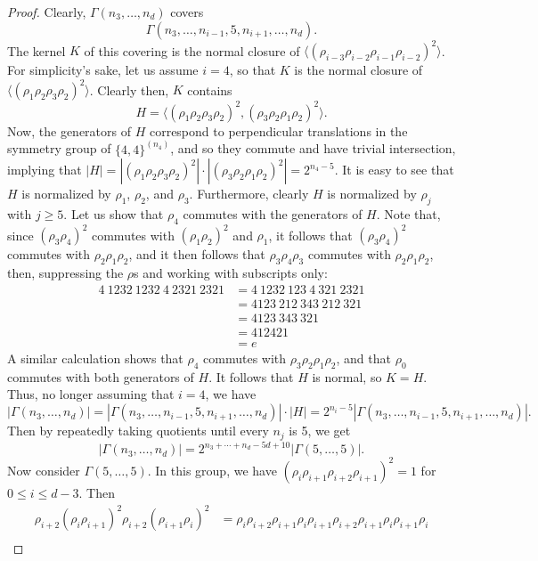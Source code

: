 \documentclass[12pt]{amsart}
\newcommand{\G}{\Gamma}
\theoremstyle{definition}
\begin{document}
\begin{proof}
Clearly, $\G(n_3, \ldots, n_d)$ covers 
	\[ \G(n_3, \ldots, n_{i-1}, 5, n_{i+1}, \ldots, n_d). \]
	The kernel $K$ of this covering is the normal closure of $\langle (\rho_{i-3} \rho_{i-2} \rho_{i-1} \rho_{i-2})^2 \rangle$. For simplicity's sake, let us assume $i = 4$, so that $K$ is the normal closure of $\langle (\rho_1 \rho_2 \rho_3 \rho_2)^2 \rangle$. Clearly then, $K$ contains
	\[ H = \langle (\rho_1 \rho_2 \rho_3 \rho_2)^2, (\rho_3 \rho_2 \rho_1 \rho_2)^2 \rangle. \]
	Now, the generators of $H$ correspond to perpendicular translations in the symmetry group of $\{4,4\}^{(n_4)}$, and so they commute and have trivial intersection, implying that $|H| = |(\rho_1 \rho_2 \rho_3 \rho_2)^2| \cdot |(\rho_3 \rho_2 \rho_1 \rho_2)^2| = 2^{n_4-5}$. It is easy to see that $H$ is normalized by $\rho_1$, $\rho_2$, and $\rho_3$. Furthermore, clearly $H$ is normalized by $\rho_j$ with $j \geq 5$. Let us show that $\rho_4$ commutes with the generators of $H$. Note that, since $(\rho_3 \rho_4)^2$ commutes with $(\rho_1 \rho_2)^2$ and $\rho_1$, it follows that $(\rho_3 \rho_4)^2$ commutes with $\rho_2 \rho_1 \rho_2$, and it then follows that $\rho_3 \rho_4 \rho_3$ commutes with $\rho_2 \rho_1 \rho_2$, then, suppressing the $\rho$s and working with subscripts only:
	\begin{align*}
	4~1232~1232~4~2321~2321 &= 4~1232~123~4~321~2321 \\
	&= 4123~212~343~212~321 \\
	&= 4123~343~321 \\
	&= 412421 \\
	&= e	
	\end{align*}
	A similar calculation shows that $\rho_4$ commutes with $\rho_3 \rho_2 \rho_1 \rho_2$, and that $\rho_0$ commutes with both generators of $H$. It follows that $H$ is normal, so $K = H$. Thus, no longer assuming that $i = 4$, we have
	\[ |\G(n_3, \ldots, n_d)| = |\G(n_3, \ldots, n_{i-1}, 5, n_{i+1}, \ldots, n_d)| \cdot |H|	= 2^{n_i-5} |\G(n_3, \ldots, n_{i-1}, 5, n_{i+1}, \ldots, n_d)|. \]
	Then by repeatedly taking quotients until every $n_j$ is 5, we get
	\[ |\G(n_3, \ldots, n_d)| = 2^{n_3 + \cdots + n_d - 5d + 10} |\G(5, \ldots, 5)|. \]
	Now consider $\G(5, \ldots, 5)$. In this group, we have $(\rho_i \rho_{i+1} \rho_{i+2} \rho_{i+1})^2 = 1$ for $0 \leq i \leq d-3$. Then
	\begin{align*}
	\rho_{i+2} (\rho_i \rho_{i+1})^2 \rho_{i+2} (\rho_{i+1} \rho_i)^2 &= \rho_i \rho_{i+2} \rho_{i+1} \rho_i \rho_{i+1} \rho_{i+2} \rho_{i+1} \rho_i \rho_{i+1} \rho_i \\

\end{align*}
\end{proof}
\end{document}
